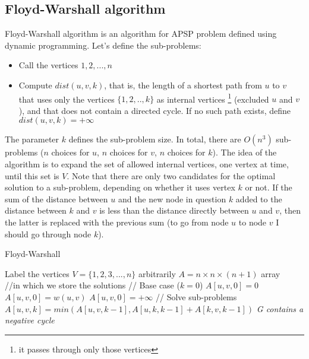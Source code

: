 \subsection{Floyd-Warshall algorithm}
Floyd-Warshall algorithm is an algorithm for APSP problem defined using dynamic programming. Let's define the sub-problems:
\begin{itemize}
    \item Call the vertices $1, 2, ..., n$

    \item Compute $dist(u, v, k)$, that is, the length of a shortest path from $u$ to $v$ that uses only the vertices $\{1, 2, .. , k\}$ as internal vertices \footnote{it passes through only those vertices} (excluded $u$ and $v$), and that does not contain a directed cycle. If no such path exists, define $dist(u, v, k) = + \infty$
\end{itemize}
The parameter $k$ defines the sub-problem size. In total, there are $O(n^3)$ sub-problems ($n$ choices for $u$, $n$ choices for $v$, $n$ choices for $k$).\newline\newline
The idea of the algorithm is to expand the set of allowed internal vertices, one vertex at time, until this set is $V$.\newpage
Note that there are only two candidates for the optimal solution to a sub-problem, depending on whether it uses vertex $k$ or not. If the sum of the distance between $u$ and the new node in question $k$ added to the distance between $k$ and $v$ is less than the distance directly between $u$ and $v$, then the latter is replaced with the previous sum (to go from node $u$ to node $v$ I should go through node $k$).
\begin{algorithm}
\caption{Floyd-Warshall}\label{Floyd-Warshall}
    \begin{algorithmic}[1]
        \State Label the vertices $V = \{1, 2, 3, ..., n\}$ arbitrarily
        \State $A = n \times n \times (n+1)$ array $\quad$ //in which we store the solutions
        \State// Base case ($k = 0$)
                    \State $A[u, v, 0] = 0$
                    \State $A[u, v, 0] = w(u, v)$
                \Else 
                    \State $A[u, v, 0] = + \infty$
                \EndIf
            \EndFor
        \EndFor
        \State // Solve sub-problems
                    \State $A[u, v, k] = min(A[u, v, k -1], A[u, k, k-1] + A[k, v, k - 1])$
                \EndFor
            \EndFor
        \EndFor
                \Return \textit{G contains a negative cycle}
            \EndIf
        \EndFor
    \EndProcedure
    \end{algorithmic}
\end{algorithm}\newline\newline
